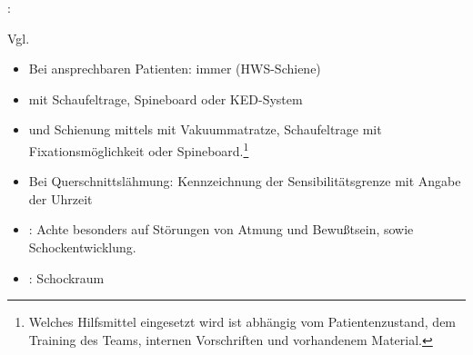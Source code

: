 \label{m:ws-trauma}
: 


Vgl. 
\begin{itemize}
  \item Bei ansprechbaren Patienten: immer
   (HWS-Schiene)
  \item {} mit Schaufeltrage, Spineboard oder
  KED-System
  \item {} und Schienung mittels
  mit Vakuummatratze, Schaufeltrage mit Fixationsmöglichkeit oder
  Spineboard.\footnote{Welches Hilfsmittel
  eingesetzt wird ist abhängig vom Patientenzustand,
  dem Training des Teams, internen Vorschriften und
  vorhandenem Material.}
  \item Bei Querschnittslähmung: Kennzeichnung der
  Sensibilitätsgrenze mit Angabe der Uhrzeit
  \item {}: Achte besonders auf Störungen
  von Atmung und Bewußtsein, sowie Schockentwicklung.
  \item {}: Schockraum
\end{itemize}